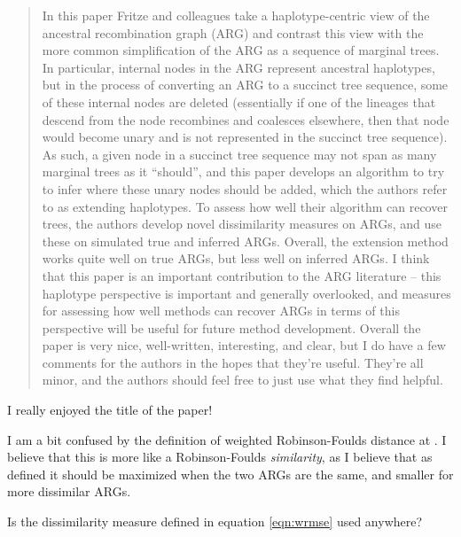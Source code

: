 \begin{quote}
In this paper Fritze and colleagues take a haplotype-centric view of the ancestral recombination graph (ARG) and contrast this view with the more common simplification of the ARG as a sequence of marginal trees. In particular, internal nodes in the ARG represent ancestral haplotypes, but in the process of converting an ARG to a succinct tree sequence, some of these internal nodes are deleted (essentially if one of the lineages that descend from the node recombines and coalesces elsewhere, then that node would become unary and is not represented in the succinct tree sequence). As such, a given node in a succinct tree sequence may not span as many marginal trees as it ``should'', and this paper develops an algorithm to try to infer where these unary nodes should be added, which the authors refer to as extending haplotypes. To assess how well their algorithm can recover trees, the authors develop novel dissimilarity measures on ARGs, and use these on simulated true and inferred ARGs. Overall, the extension method works quite well on true ARGs, but less well on inferred ARGs. I think that this paper is an important contribution to the ARG literature -- this haplotype perspective is important and generally overlooked, and measures for assessing how well methods can recover ARGs in terms of this perspective will be useful for future method development. Overall the paper is very nice, well-written, interesting, and clear, but I do have a few comments for the authors in the hopes that they're useful. They're all minor, and the authors should feel free to just use what they find helpful.
\end{quote}

\begin{point}{}
 I really enjoyed the title of the paper!
\end{point}


\begin{point}{\revref}
 I am a bit confused by the definition of weighted Robinson-Foulds distance at \revref.%
I believe that this is more like a Robinson-Foulds \emph{similarity}, as I believe that as defined it should be maximized when the two ARGs are the same, and smaller for more dissimilar ARGs.
\end{point}


\begin{point}{}
 Is the dissimilarity measure defined in equation \eqref{eqn:wrmse} used anywhere?
\end{point}

